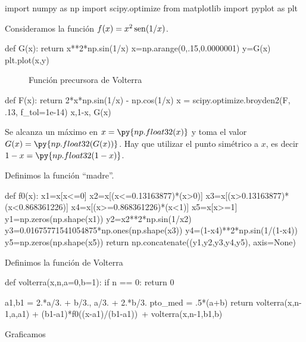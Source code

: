 \begin{pyblock}
import numpy as np
import scipy.optimize
from matplotlib import pyplot as plt
\end{pyblock}

Consideramos  la función $f(x)=x^2\operatorname{sen}(1/x)$. 

\begin{pyblock}
def G(x):
    return x**2*np.sin(1/x)
x=np.arange(0,.15,0.0000001)
y=G(x)
plt.plot(x,y)
\end{pyblock}


 \begin{figure}[h]
 \begin{center}
 \caption{Función precursora de Volterra}
\end{center}
 \end{figure}





\begin{pyblock}
def F(x):
    return 2*x*np.sin(1/x) - np.cos(1/x)
x = scipy.optimize.broyden2(F, .13, f_tol=1e-14)
x,1-x, G(x)
\end{pyblock}

Se alcanza un máximo en $x=\py{np.float32(x)}$ y toma el valor $G(x)=\py{np.float32(G(x))}$. Hay que utilizar el punto simétrico a $x$, es decir $1-x=\py{np.float32(1-x)}$.


Definimos la función ``madre''.



\begin{pyblock}
def f0(x):
    x1=x[x<=0]
    x2=x[(x<=0.13163877)*(x>0)]
    x3=x[(x>0.13163877)*(x<0.868361226)]
    x4=x[(x>=0.868361226)*(x<1)]
    x5=x[x>=1]
    y1=np.zeros(np.shape(x1))
    y2=x2**2*np.sin(1/x2)
    y3=0.01675771541054875*np.ones(np.shape(x3))
    y4=(1-x4)**2*np.sin(1/(1-x4))
    y5=np.zeros(np.shape(x5))
    return np.concatenate((y1,y2,y3,y4,y5), axis=None)
\end{pyblock}

Definimos la función de Volterra
\begin{pyverbatim}
def volterra(x,n,a=0,b=1):
    if n == 0:
        return 0
    
    a1,b1 = 2.*a/3. + b/3., a/3. + 2.*b/3.
    pto_med = .5*(a+b)
    return volterra(x,n-1,a,a1) + (b1-a1)*f0((x-a1)/(b1-a1))\
    + volterra(x,n-1,b1,b)
\end{pyverbatim}

Graficamos

